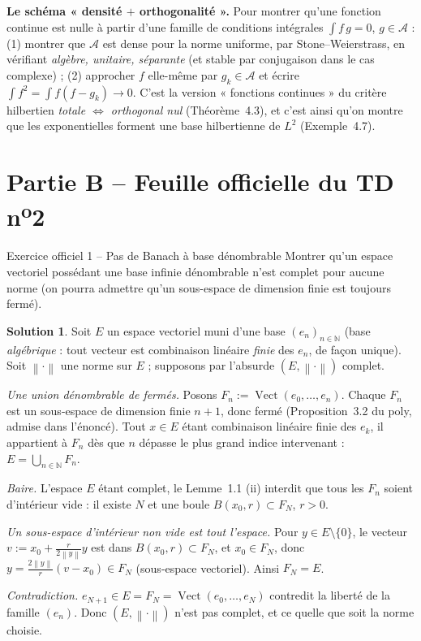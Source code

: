 \documentclass[11pt,a4paper]{article}
\newcommand{\N}{\mathbb{N}}
\newcommand{\Vect}{\operatorname{Vect}}
\newcommand{\norm}[1]{\left\|#1\right\|}
\theoremstyle{definition}
\newtheorem*{solution}{Solution}
\begin{document}
\begin{methode}
\textbf{Le schéma « densité $+$ orthogonalité ».} Pour montrer qu'une fonction continue est nulle à partir d'une famille de conditions intégrales $\int f\,g=0$, $g\in\mathcal A$ : (1) montrer que $\mathcal A$ est dense pour la norme uniforme, par Stone--Weierstrass, en vérifiant \emph{algèbre, unitaire, séparante} (et stable par conjugaison dans le cas complexe) ; (2) approcher $f$ elle-même par $g_k\in\mathcal A$ et écrire $\int f^2=\int f(f-g_k)\to0$. C'est la version « fonctions continues » du critère hilbertien \emph{totale $\iff$ orthogonal nul} (Théorème~4.3), et c'est ainsi qu'on montre que les exponentielles forment une base hilbertienne de $L^2$ (Exemple~4.7).
\end{methode}

\section*{Partie B -- Feuille officielle du TD n\textsuperscript{o}2}

\begin{exo}{Exercice officiel 1 -- Pas de Banach à base dénombrable}
Montrer qu'un espace vectoriel possédant une base infinie dénombrable n'est complet pour aucune norme (on pourra admettre qu'un sous-espace de dimension finie est toujours fermé).
\end{exo}

\begin{solution}
Soit $E$ un espace vectoriel muni d'une base $(e_n)_{n\in\N}$ (base \emph{algébrique} : tout vecteur est combinaison linéaire \emph{finie} des $e_n$, de façon unique). Soit $\norm\cdot$ une norme sur $E$ ; supposons par l'absurde $(E,\norm\cdot)$ complet.

\emph{Une union dénombrable de fermés.} Posons $F_n:=\Vect(e_0,\dots,e_n)$. Chaque $F_n$ est un sous-espace de dimension finie $n+1$, donc fermé (Proposition~3.2 du poly, admise dans l'énoncé). Tout $x\in E$ étant combinaison linéaire finie des $e_k$, il appartient à $F_n$ dès que $n$ dépasse le plus grand indice intervenant : $E=\bigcup_{n\in\N}F_n$.

\emph{Baire.} L'espace $E$ étant complet, le Lemme~1.1 (ii) interdit que tous les $F_n$ soient d'intérieur vide : il existe $N$ et une boule $B(x_0,r)\subset F_N$, $r>0$.

\emph{Un sous-espace d'intérieur non vide est tout l'espace.} Pour $y\in E\setminus\{0\}$, le vecteur $v:=x_0+\frac{r}{2\norm y}y$ est dans $B(x_0,r)\subset F_N$, et $x_0\in F_N$, donc $y=\frac{2\norm y}{r}(v-x_0)\in F_N$ (sous-espace vectoriel). Ainsi $F_N=E$.

\emph{Contradiction.} $e_{N+1}\in E=F_N=\Vect(e_0,\dots,e_N)$ contredit la liberté de la famille $(e_n)$. Donc $(E,\norm\cdot)$ n'est pas complet, et ce quelle que soit la norme choisie.
\end{solution}
\end{document}
